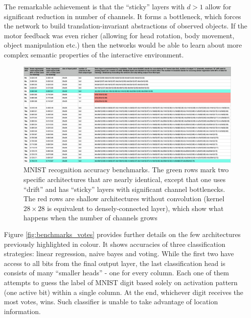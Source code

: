 \documentclass[12pt]{article}
\begin{document}
The remarkable achievement is that the ``sticky'' layers with $d>1$ allow for significant reduction in number of channels. It forms a bottleneck, which forces the network to build translation-invariant abstractions of observed objects. If the motor feedback was even richer (allowing for head rotation, body movement, object manipulation etc.) then the networks would be able to learn about more complex semantic properties of the interactive environment.


\begin{figure}[!htbp]
	\centering
	\includegraphics[width=13.8cm]{benchmarks}
	\caption{MNIST recognition accuracy benchmarks. The green rows mark two specific architectures that are nearly identical, except that one uses ``drift'' and has ``sticky'' layers with significant channel bottlenecks.  The red rows are shallow architectures without convolution (kernel $28\times28$ is equivalent to densely-connected layer), which show what happens when the number of channels grows}
	\label{fig:benchmarks}
\end{figure} 

Figure \ref{fig:benchmarks_votes} provides further details on the few architectures previously highlighted in colour. It shows accuracies of three classification strategies: linear regression, naive bayes and voting. While the first two have access to all bits from the final output layer, the last classification head is consists of many ``smaller heads'' - one for every column. Each one of them attempts to guess the label of MNIST digit based solely on activation pattern (one active bit) within a single column. At the end, whichever digit receives the most votes, wins. Such classifier is unable to take advantage of location information. 
\end{document}
